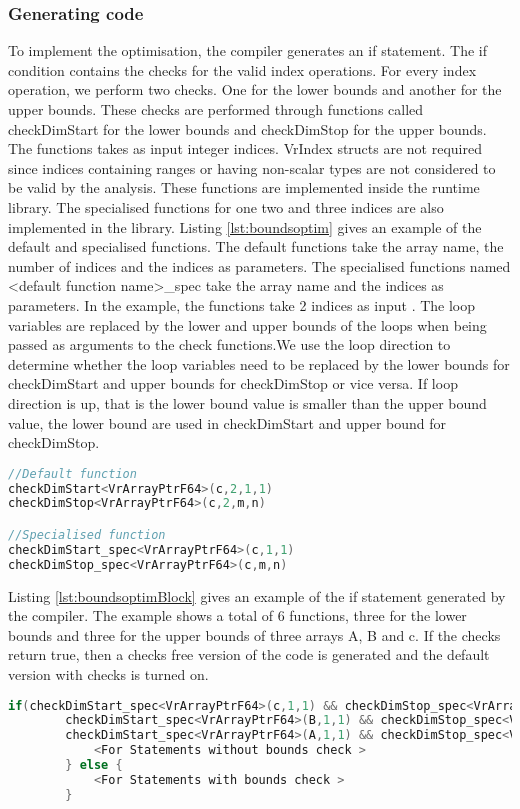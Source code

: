 \subsubsection{Generating code}
To implement the optimisation, the compiler generates an if statement. The if condition contains the checks for the valid index operations. For every index operation, we perform two checks. One for the lower bounds and another for the upper bounds. These checks are performed through functions called checkDimStart for the lower bounds and checkDimStop for the upper bounds. The functions takes as input integer indices. VrIndex structs are not required since indices containing ranges or having non-scalar types are not considered to be valid by the analysis. These functions are implemented inside the runtime library. The specialised functions for one two and three indices are also implemented in the library. Listing \ref{lst:boundsoptim} gives an example of the default and specialised functions. The default functions take the array name, the number of indices and the indices as parameters. The specialised functions named <default function name>\_spec take the array name and the indices as parameters. In the example, the functions take 2 indices as input . The loop variables are replaced by the lower and upper bounds of the loops when being passed as arguments to the check functions.We use the loop direction to determine whether the loop variables need to be replaced by the lower bounds for checkDimStart and upper bounds for checkDimStop or vice versa. If loop direction is up, that is the lower bound value is smaller than the upper bound value, the lower bound are used in checkDimStart and upper bound for checkDimStop. \\
\begin{lstlisting}[float,language=c,caption={An example of the default and specialised function calls for the boundscheck optimisations},label={lst:boundsoptim}]
//Default function
checkDimStart<VrArrayPtrF64>(c,2,1,1)
checkDimStop<VrArrayPtrF64>(c,2,m,n)

//Specialised function
checkDimStart_spec<VrArrayPtrF64>(c,1,1)
checkDimStop_spec<VrArrayPtrF64>(c,m,n)
\end{lstlisting}
Listing \ref{lst:boundsoptimBlock} gives an example of the if statement generated by the compiler. The example shows a total of 6 functions, three for the lower bounds and three for the upper bounds of three arrays A, B and c. If the checks return true, then a checks free version of the code is generated and the default version with checks is turned on. 
\begin{lstlisting}[float,language=c,caption={An example of the if statement generated for the boundscheck optimisations},label={lst:boundsoptimBlock}]
 if(checkDimStart_spec<VrArrayPtrF64>(c,1,1) && checkDimStop_spec<VrArrayPtrF64>(c,m,n) && 
		checkDimStart_spec<VrArrayPtrF64>(B,1,1) && checkDimStop_spec<VrArrayPtrF64>(B,k,n) && 
		checkDimStart_spec<VrArrayPtrF64>(A,1,1) && checkDimStop_spec<VrArrayPtrF64>(A,m,k)) {
			<For Statements without bounds check >	
		} else {
			<For Statements with bounds check >	
		}
	
\end{lstlisting}
